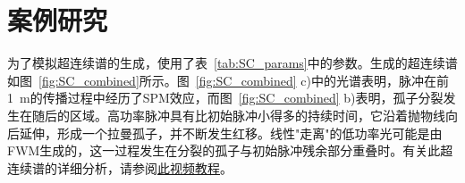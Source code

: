 \begin{table}[]
\end{table}

\section{案例研究}
为了模拟超连续谱的生成，使用了表~\ref{tab:SC_params}中的参数。生成的超连续谱如图~\ref{fig:SC_combined}所示。图~\ref{fig:SC_combined} c)中的光谱表明，脉冲在前1~m的传播过程中经历了SPM效应，而图~\ref{fig:SC_combined} b)表明，孤子分裂发生在随后的区域。高功率脉冲具有比初始脉冲小得多的持续时间，它沿着抛物线向后延伸，形成一个拉曼孤子，并不断发生红移。线性"走离"的低功率光可能是由FWM生成的，这一过程发生在分裂的孤子与初始脉冲残余部分重叠时。有关此超连续谱的详细分析，请参阅\href{https://youtu.be/-GDsMDpC3oA}{此视频教程}。

